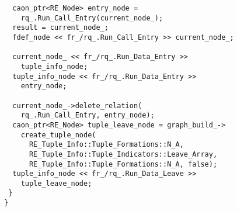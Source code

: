 \begin{lstlisting}
  caon_ptr<RE_Node> entry_node = 
    rq_.Run_Call_Entry(current_node_);
  result = current_node_;
  fdef_node << fr_/rq_.Run_Call_Entry >> current_node_;
  
  current_node_ << fr_/rq_.Run_Data_Entry >> 
    tuple_info_node;
  tuple_info_node << fr_/rq_.Run_Data_Entry >> 
    entry_node;
	
  current_node_->delete_relation(
    rq_.Run_Call_Entry, entry_node);
  caon_ptr<RE_Node> tuple_leave_node = graph_build_->
    create_tuple_node(
      RE_Tuple_Info::Tuple_Formations::N_A,
      RE_Tuple_Info::Tuple_Indicators::Leave_Array, 
      RE_Tuple_Info::Tuple_Formations::N_A, false);
  tuple_info_node << fr_/rq_.Run_Data_Leave >> 
    tuple_leave_node;
 }
}

\end{lstlisting}


